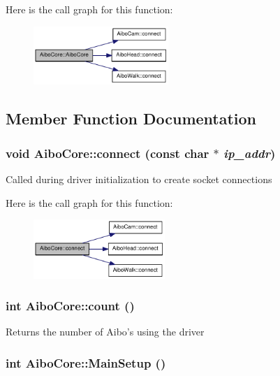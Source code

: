 Here is the call graph for this function:\nopagebreak
\begin{figure}[H]
\begin{center}
\leavevmode
\includegraphics[width=145pt]{classAiboCore_a377640056394d6235609688045288fe7_cgraph}
\end{center}
\end{figure}


\subsection{Member Function Documentation}
\hypertarget{classAiboCore_a078c3b2541d57e7455094ef7c9e46c80}{
\subsubsection[{connect}]{\setlength{\rightskip}{0pt plus 5cm}void AiboCore::connect (const char $\ast$ {\em ip\_\-addr})}}
\label{classAiboCore_a078c3b2541d57e7455094ef7c9e46c80}
Called during driver initialization to create socket connections 

Here is the call graph for this function:\nopagebreak
\begin{figure}[H]
\begin{center}
\leavevmode
\includegraphics[width=141pt]{classAiboCore_a078c3b2541d57e7455094ef7c9e46c80_cgraph}
\end{center}
\end{figure}
\hypertarget{classAiboCore_a7cf6b6a288291b36254dc29ae089d6bc}{
\subsubsection[{count}]{\setlength{\rightskip}{0pt plus 5cm}int AiboCore::count ()}}
\label{classAiboCore_a7cf6b6a288291b36254dc29ae089d6bc}
Returns the number of Aibo's using the driver \hypertarget{classAiboCore_a940aa3f41c521cfc8e1ea69b8a616648}{
\subsubsection[{MainSetup}]{\setlength{\rightskip}{0pt plus 5cm}int AiboCore::MainSetup ()}}
\label{classAiboCore_a940aa3f41c521cfc8e1ea69b8a616648}


